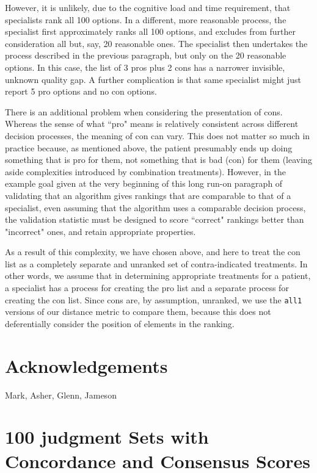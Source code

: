 \documentclass{article}
\begin{document}
However, it is unlikely, due to the cognitive load and time requirement, that specialists rank all 100 options. In a different, more reasonable process, the specialist first approximately ranks all 100 options, and excludes from further consideration all but, say, 20 reasonable ones. The specialist then undertakes the process described in the previous paragraph, but only on the 20  reasonable options. In this case, the list of 3 pros plus 2 cons has a narrower invisible, unknown quality gap. A further complication is that same specialist might just report 5 pro options and no con options. 

There is an additional problem when considering the presentation of cons. Whereas the sense of what ``pro" means is relatively consistent across different decision processes, the meaning of con can vary. This does not matter so much in practice because, as mentioned above, the patient presumably ends up doing something that is pro for them, not something that is bad (con) for them (leaving aside complexities introduced by combination treatments). However, in the example goal given at the very beginning of this long run-on paragraph of validating that an algorithm gives rankings that are comparable to that of a specialist, even assuming that the algorithm uses a comparable decision process, the validation statistic must be designed to score ``correct" rankings better than "incorrect" ones, and retain appropriate properties. 

As a result of this complexity, we have chosen above, and here to treat the con list as a completely separate and unranked set of contra-indicated treatments. In other words, we assume that in determining appropriate treatments for a patient, a specialist has a process for creating the pro list and a separate process for creating the con list. Since cons are, by assumption, unranked, we use the \texttt{all1} versions of our distance metric to compare them, because this does not deferentially consider the position of elements in the ranking.



\newpage
\section{Acknowledgements}
Mark, Asher, Glenn, Jameson

\newpage



\newpage
\appendix
\singlespacing

\section{100 judgment Sets with Concordance and Consensus Scores}
\end{document}
